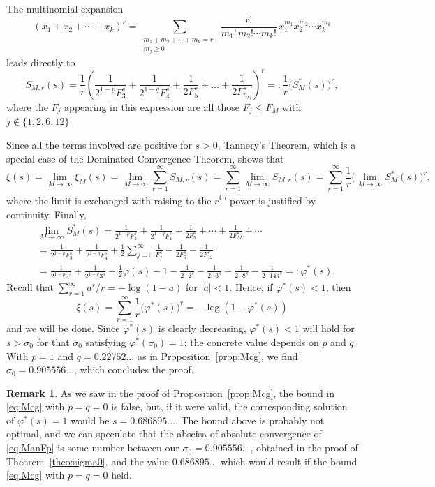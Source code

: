 \documentclass[11pt, a4paper]{article}
\newcommand{\manF}{\Lambda_{\mathcal{F}}}
\theoremstyle{plain}
\theoremstyle{definition}
\newtheorem{remark}[theorem]{Remark}
\begin{document}
The multinomial expansion
\[
(x_1+x_2+\cdots+x_k)^{r} =
\sum_{\substack{m_1+m_2+\cdots+m_k=r,\\ m_j \ge 0}} \frac{r!}{m_1!\,m_2!\cdots m_k!} \, x_1^{m_1} x_2^{m_2} \cdots x_k^{m_k}
\]
leads directly to
\[
S_{M,r}(s) = \frac{1}{r} \left( \frac{1}{2^{1-p}F_3^s} + \frac{1}{2^{1-q}F_4^s} + \frac{1}{2F_5^s} 
+ \dots + \frac{1}{2F_{n_{k_l}}^s} \right)^r
=: \frac{1}{r} \Big( S_{M}^{*}(s) \Big)^r,
\]
where the $F_{j}$ appearing in this expression are all those $F_j \le F_M$ with $j \notin \{1,2,6,12\}$ 

Since all the terms involved are positive for $s > 0$, Tannery's Theorem, which is a special case of the Dominated Convergence Theorem, shows that
\[
  \xi(s) = \lim_{M\to\infty} \xi_M(s)
  = \lim_{M\to\infty} \sum_{r=1}^{\infty} S_{M,r}(s)
  = \sum_{r=1}^{\infty} \lim_{M\to\infty} S_{M,r}(s)
  = \sum_{r=1}^{\infty} \frac{1}{r} \Big(\lim_{M\to\infty} S_{M}^{*}(s) \Big)^r,
\]
where the limit is exchanged with raising to the $r$\textsuperscript{th} power is justified by continuity. Finally,
\begin{align*}
&\lim_{M\to\infty} S_{M}^{*}(s)
= \frac{1}{2^{1-p}F_3^s} + \frac{1}{2^{1-q}F_4^s} + \frac{1}{2F_5^s} + \cdots + \frac{1}{2F_{M}^s} + \cdots \\
&= \frac{1}{2^{1-p}F_3^s} + \frac{1}{2^{1-q}F_4^s} + \frac{1}{2} \sum_{j=5}^{\infty} \frac{1}{F_j^s}
- \frac{1}{2F_6^s} - \frac{1}{2F_{12}^s} \\
&= \frac{1}{2^{1-p}2^s} + \frac{1}{2^{1-q}3^s} + \frac{1}{2} \varphi(s) - 1
- \frac{1}{2 \cdot 2^s} - \frac{1}{2 \cdot 3^s} - \frac{1}{2 \cdot 8^s} - \frac{1}{2 \cdot 144^s} 
=: \varphi^{*}(s).
\end{align*}
Recall that $\sum_{r=1}^\infty a^r/r = -\log(1-a)$ for $|a|<1$. Hence, if $\varphi^{*}(s) < 1$, then
\[
\xi(s) = \sum_{r=1}^{\infty} \frac{1}{r} \Big(\varphi^{*}(s)\Big)^r
= -\log(1-\varphi^{*}(s))
\]
and we will be done. Since $\varphi^{*}(s)$ is clearly decreasing, $\varphi^{*}(s) < 1$ will hold for $s > \sigma_0$ for that $\sigma_0$ satisfying $\varphi^{*}(\sigma_0) = 1$; the concrete value depends on $p$ and $q$. With $p=1$ and $q = 0.22752\dots$ as in Proposition~\ref{prop:Mcg}, we find $\sigma_0=0.905556\dots$, which concludes the proof.

\begin{remark}
As we saw in the proof of Proposition~\ref{prop:Mcg}, the bound in \eqref{eq:Mcg} with $p=q=0$ is false, but, if it were valid, the corresponding solution of $\varphi^{*}(s) = 1$ would be $s=0.686895\dots$. The bound above is probably not optimal, and we can speculate that the abscisa of absolute convergence of \eqref{eq:ManFp} is some number between our $\sigma_0=0.905556\dots$, obtained in the proof of Theorem~\ref{theo:sigma0}, and the value $0.686895\dots$ which would result if the bound \eqref{eq:Mcg} with $p=q=0$ held.
\end{remark}
\end{document}
